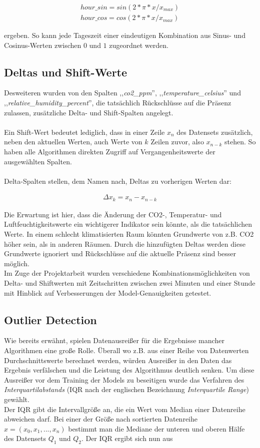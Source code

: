 \begin{align}
    hour\_sin = sin(2 * \pi * x / x_{max}) \\ 
    hour\_cos = cos(2 * \pi * x / x_{max})
\end{align} 

ergeben. So kann jede Tageszeit einer eindeutigen Kombination aus Sinus- und Cosinus-Werten zwischen 
$0$ und $1$ zugeordnet werden.

\subsection{Deltas und Shift-Werte}
Desweiteren wurden von den Spalten ,,\textit{co2\_ppm}'', ,,\textit{temperature\_celsius}'' und \break 
,,\textit{relative\_humidity\_percent}'', die tatsächlich Rückschlüsse auf die Präsenz zulassen, \break 
zusätzliche Delta- und Shift-Spalten angelegt.\\\\
Ein Shift-Wert bedeutet lediglich, dass  in einer Zeile $x_n$ des Datensets 
zusätzlich, neben den aktuellen Werten, auch Werte von $k$ Zeilen zuvor, also $x_{n-k}$ stehen. So haben 
alle Algorithmen direkten Zugriff auf Vergangenheitswerte der ausgewählten Spalten.\\\\
Delta-Spalten stellen, dem Namen nach, Deltas zu vorherigen Werten dar:

\begin{align}
    \Delta x_k = x_n - x_{n-k}    
\end{align}

Die Erwartung ist hier, dass die Änderung der CO2-, Temperatur- und 
Luftfeuchtigkeitswerte ein wichtigerer Indikator sein könnte, als die tatsächlichen Werte. In einem schlecht 
klimatisierten Raum könnten Grundwerte von z.B. CO2 höher sein, als in anderen Räumen. Durch die hinzufügten 
Deltas werden diese Grundwerte ignoriert und Rückschlüsse auf die aktuelle Präsenz sind besser möglich.\\
Im Zuge der Projektarbeit wurden verschiedene Kombinationsmöglichkeiten von Delta- und Shiftwerten mit 
Zeitschritten zwischen zwei Minuten und einer Stunde mit Hinblick auf Verbesserungen der Model-Genauigkeiten 
getestet.

\subsection{Outlier Detection}
Wie bereits erwähnt, spielen Datenausreißer für die Ergebnisse mancher Algorithmen eine große Rolle. Überall 
wo z.B. aus einer Reihe von Datenwerten Durchschnittswerte berechnet werden, würden Ausreißer in den Daten das 
Ergebnis verfälschen und die Leistung des Algorithmus deutlich senken.
Um diese Ausreißer vor dem Training der Models zu beseitigen wurde das Verfahren des 
\textit{Interquartilabstands} (IQR nach der englischen Bezeichnung \textit{Interquartile Range}) gewählt.\\
Der IQR gibt die Intervallgröße an, die ein Wert vom Median einer Datenreihe abweichen darf. Bei einer 
der Größe nach sortierten Datenreihe $x = (x_0,x_1,...,x_n)$ bestimmt man die Mediane der unteren und oberen 
Hälfe des Datensets $Q_1$ und $Q_2$. Der IQR ergibt sich nun aus 

